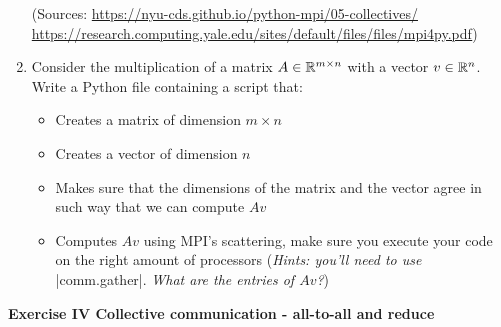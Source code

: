 \documentclass[11pt]{article}
\begin{document}
\begin{enumerate}
\begin{figure}[H]
\begin{subfigure}[b]{0.8\textwidth}
     \end{subfigure}
\end{figure}
(Sources: \url{https://nyu-cds.github.io/python-mpi/05-collectives/} \\ \url{https://research.computing.yale.edu/sites/default/files/files/mpi4py.pdf})
    \item Consider the multiplication of a matrix $A \in \mathbb{R}^{m \times n}$ with a vector $v \in \mathbb{R}^n$. Write a Python file containing a script that:
    \begin{itemize}
        \item Creates a matrix of dimension $m \times n$
        \item Creates a vector of dimension $n$
        \item Makes sure that the dimensions of the matrix and the vector agree in such way that we can compute $Av$
        \item Computes $Av$ using MPI's scattering, make sure you execute your code on the right amount of processors (\textit{Hints: you'll need to use} |comm.gather|. \textit{What are the entries of $Av$?}) \\
        
    \end{itemize}
\end{enumerate}

{\bf{Exercise IV Collective communication - all-to-all and reduce }}\\
\end{document}
